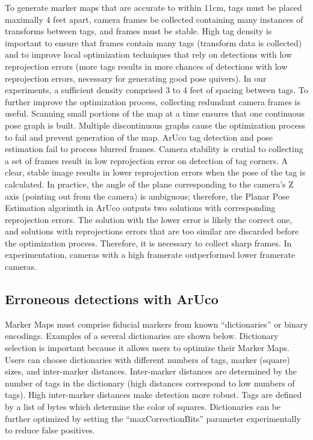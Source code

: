 \documentclass{article}
\begin{document}
    To generate marker maps that are accurate to within 11cm, tags must be placed maximally 4 feet apart, camera frames be collected containing many instances of transforms between tags, and frames must be stable. High tag density is important to ensure that frames contain many tags (transform data is collected) and to improve local optimization techniques that rely on detections with low reprojection errors (more tags results in more chances of detections with low reprojection errors, necessary for generating good pose quivers)\cite{munoz-salinas_rafael_mapping_2016}. In our experiments, a sufficient density comprised 3 to 4 feet of spacing between tags. To further improve the optimization process, collecting redundant camera frames is useful. Scanning small portions of the map at a time ensures that one continuous pose graph is built. Multiple discontinuous graphs cause the optimization process to fail and prevent generation of the map. ArUco tag detection and pose estimation fail to process blurred frames. Camera stability is crutial to collecting a set of frames result in low reprojection error on detection of tag corners. A clear, stable image results in lower reprojection errors when the pose of the tag is calculated. In practice, the angle of the plane corresponding to the camera's Z axis (pointing out from the camera) is ambiguous; therefore, the Planar Pose Estimation algorimth in ArUco outputs two solutions with corresponding reprojection errors. The solution with the lower error is likely the correct one, and solutions with reprojections errors that are too similar are discarded before the optimization process\cite{munoz-salinas_rafael_mapping_2016}. Therefore, it is necessary to collect sharp frames. In experimentation, cameras with a high framerate outperformed lower framerate cameras.

	\subsection{Erroneous detections with ArUco}

    Marker Maps must comprise fiducial markers from known ``dictionaries'' or binary encodings. Examples of a several dictionaries are shown below. Dictionary selection is important because it allows users to optimize their Marker Maps. Users can choose dictionaries with different numbers of tags, marker (square) sizes, and inter-marker distances. Inter-marker distances are determined by the number of tags in the dictionary (high distances correspond to low numbers of tags). High inter-marker distances make detection more robust. Tags are defined by a list of bytes which determine the color of squares. Dictionaries can be further optimized by setting the ``maxCorrectionBits'' parameter experimentally to reduce false positives\cite{open_source_computer_vision_detection_2015}.
\end{document}
